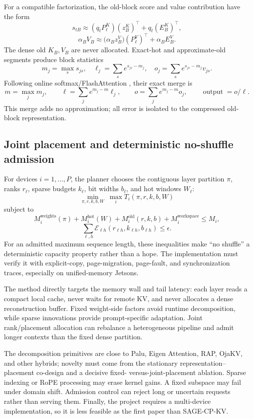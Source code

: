 \documentclass[10pt]{article}
\begin{document}
For a compatible factorization, the old-block score and value contribution have the form
\[
s_{tB}\approx (q_tP^K_\ell)(z_B^K)^\top+q_t(E_B^K)^\top,
\]
\[
\alpha_BV_B\approx
\big(\alpha_Bz_B^V\big)(P^V_\ell)^\top+\alpha_BE_B^V.
\]
The dense old $K_B,V_B$ are never allocated. Exact-hot and approximate-old segments produce
block statistics
\[
m_j=\max_s s_{js},\quad
\ell_j=\sum_s e^{s_{js}-m_j},\quad
o_j=\sum_s e^{s_{js}-m_j}v_{js}.
\]
Following online softmax/FlashAttention \cite{onlinesoftmax,flashattention}, their exact merge is
\[
m=\max_jm_j,\qquad
\ell=\sum_je^{m_j-m}\ell_j,\qquad
o=\sum_je^{m_j-m}o_j,\qquad
\operatorname{output}=o/\ell.
\]
This merge adds no approximation; all error is isolated to the compressed old-block
representation.

\subsection{Joint placement and deterministic no-shuffle admission}

For devices $i=1,\ldots,P$, the planner chooses the contiguous layer partition $\pi$, ranks
$r_\ell$, sparse budgets $k_\ell$, bit widths $b_\ell$, and hot windows $W_\ell$:
\[
\min_{\pi,r,k,b,W}\ \max_i T_i(\pi,r,k,b,W)
\]
subject to
\[
M_i^{\mathrm{weights}}(\pi)+M_i^{\mathrm{hot}}(W)
+M_i^{\mathrm{old}}(r,k,b)+M_i^{\mathrm{workspace}}\le M_i,
\]
\[
\sum_{\ell,h}\mathcal E_{\ell h}(r_{\ell h},k_{\ell h},b_{\ell h})
\le\epsilon .
\]
For an admitted maximum sequence length, these inequalities make ``no shuffle'' a deterministic
capacity property rather than a hope. The implementation must verify it with explicit-copy,
page-migration, page-fault, and synchronization traces, especially on unified-memory Jetsons.

\begin{donebox}[title={Expected advantages}]
The method directly targets the memory wall and tail latency: each layer reads a compact local
cache, never waits for remote KV, and never allocates a dense reconstruction buffer. Fixed
weight-side factors avoid runtime decomposition, while sparse innovations provide prompt-specific
adaptation. Joint rank/placement allocation can rebalance a heterogeneous pipeline and admit
longer contexts than the fixed dense partition.
\end{donebox}

\begin{riskbox}[title={Possible limitations}]
The decomposition primitives are close to Palu, Eigen Attention, RAP, OjaKV, and other hybrids;
novelty must come from the stationary representation--placement co-design and a decisive fixed-
versus-joint-placement ablation. Sparse indexing or RoPE processing may erase kernel gains.
A fixed subspace may fail under domain shift. Admission control can reject long or uncertain
requests rather than serving them. Finally, the project requires a multi-device implementation,
so it is less feasible as the first paper than SAGE-CP-KV.
\end{riskbox}
\end{document}
